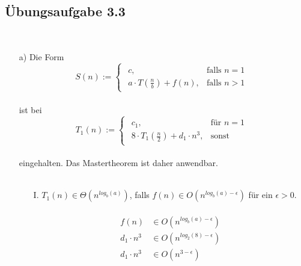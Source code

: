 \documentclass{article}
\begin{document}
\subsection{Übungsaufgabe 3.3}
\begin{flushright}
\begin{Large}
[~~~~\string| ~~3~]
\end{Large}
\end{flushright}
\vspace{1cm}\-\\
\begin{enumerate}
    \item [a)]
    Die Form\\
    \[
	S(n) :=  \begin{cases}
	    	\begin{array}{ll}
    			c, & \text{falls }n=1\\
				a \cdot T(\frac{n}{b})+f(n), &\text{falls }n>1
			\end{array}
		\end{cases}
   	\]
   	\\
   	ist bei\\
   	\[
	T_1(n) := \begin{cases}
				\begin{array}{ll}
					c_1,			& \text{für }n=1\\
					8 \cdot T_1(\frac{n}{2})+d_1\cdot n^3, & \text{sonst}
				\end{array}
			\end{cases}
   	\]
   	\\
   	eingehalten. Das Mastertheorem ist daher anwendbar.\\
   	\\
   	\begin{enumerate}
   	    \item[I.]
   	    $T_1(n) \in \Theta (n^{log_b(a)})$, falls $f(n) \in O(n^{log_b(a)- \epsilon})$ für ein $\epsilon > 0$.\\
   	    \\
   	    \[
   	        \begin{array}{ll}
   	            f(n) &\in O(n^{log_b(a)- \epsilon})\\
   	            d_1\cdot n^3 &\in O(n^{log_2(8)- \epsilon})\\
   	            d_1\cdot n^3 &\in O(n^{3- \epsilon})
   	        \end{array}
   	    \]
   	    \\

\end{enumerate}
\end{enumerate}
\end{document}
